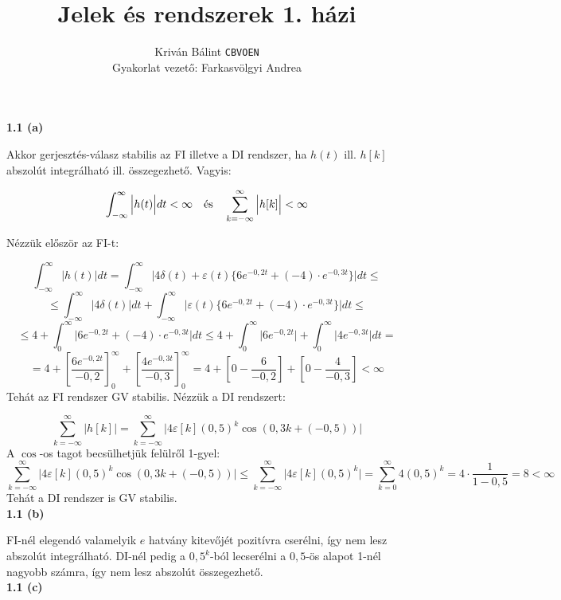 \documentclass[12pt,a4paper]{article}
\title{\vspace{-2ex}Jelek és rendszerek 1. házi}
\author{Kriván Bálint \texttt{CBVOEN}\\
Gyakorlat vezető: Farkasvölgyi Andrea}
\begin{document}
\maketitle

\thispagestyle{fancy}

\textbf{1.1 (a)}

Akkor gerjesztés-válasz stabilis az FI illetve a DI rendszer, ha $h(t)$ ill. $h[k]$ abszolút integrálható ill. összegezhető. Vagyis:

\[\int_{-\infty}^{\infty}\Big|h(t)\Big| dt < \infty \quad \hbox{és} \quad \sum_{k=-\infty}^{\infty} \Big|h[k]\Big| < \infty\]

Nézzük először az FI-t:

\[\int_{-\infty}^{\infty}\Big|h(t)\Big| dt = \int_{-\infty}^{\infty}\Big|4\delta(t)+\varepsilon(t)\{6e^{-0,2t}+(-4)\cdot e^{-0,3t}\}\Big| dt \leqslant \]
\[\leqslant \int_{-\infty}^{\infty}\Big|4\delta(t)\Big| dt +\int_{-\infty}^{\infty}\Big|\varepsilon(t)\{6e^{-0,2t}+(-4)\cdot e^{-0,3t}\}\Big| dt \leqslant\]
\[\leqslant 4 +\int_{0}^{\infty}\Big|6e^{-0,2t}+(-4)\cdot e^{-0,3t}\Big| dt \leqslant 4 +\int_{0}^{\infty}\Big|6e^{-0,2t}\Big| + \int_{0}^{\infty}\Big|4e^{-0,3t}\Big| dt = \]
\[= 4 +\left[\frac{6e^{-0,2t}}{-0,2}\right]^{\infty}_{0} + \left[\frac{4e^{-0,3t}}{-0,3}\right]^{\infty}_{0} = 4 +\left[0-\frac{6}{-0,2}\right] + \left[0-\frac{4}{-0,3}\right] < \infty\]
Tehát az FI rendszer GV stabilis. Nézzük a DI rendszert:

\[\sum_{k=-\infty}^{\infty} \Big|h[k]\Big| = \sum_{k=-\infty}^{\infty} \Big|4\varepsilon[k](0,5)^k\cos(0,3k+(-0,5))\Big|\]
A $\cos$-os tagot becsülhetjük felülről 1-gyel:
\[\sum_{k=-\infty}^{\infty} \Big|4\varepsilon[k](0,5)^k\cos(0,3k+(-0,5))\Big| \leqslant \sum_{k=-\infty}^{\infty} \Big|4\varepsilon[k](0,5)^k\Big| = \sum_{k=0}^{\infty} 4(0,5)^k = 4\cdot \frac{1}{1-0,5} = 8 < \infty\]
Tehát a DI rendszer is GV stabilis.\\

\textbf{1.1 (b)}

FI-nél elegendó valamelyik $e$ hatvány kitevőjét pozitívra cserélni, így nem lesz abszolút integrálható. DI-nél pedig a $0,5^k$-ból lecserélni a $0,5$-ös alapot 1-nél nagyobb számra, így nem lesz abszolút összegezhető.\\

\textbf{1.1 (c)}
\end{document}
